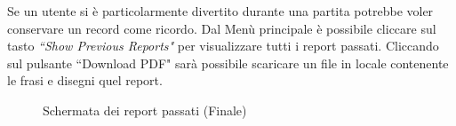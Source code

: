 \noindent Se un utente si è particolarmente divertito durante una partita potrebbe voler conservare un record come ricordo.
Dal Menù principale è possibile cliccare sul tasto \textit{``Show Previous Reports"} per visualizzare tutti i report passati. Cliccando sul pulsante ``Download PDF" sarà possibile scaricare un file in locale contenente le frasi e disegni quel report.
\begin{figure}[H]
    \caption{Schermata dei report passati (Finale)}
    \centering
    \label{fig:previous_report}
\end{figure}

\newpage
